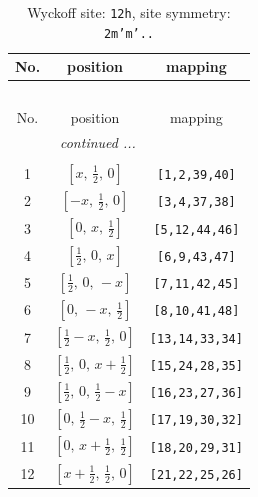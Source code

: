 \documentclass[fleqn,8pt]{jsarticle}
\begin{document}
\begin{longtable}{ccc}
\caption{Wyckoff site: {\tt 12h}, site symmetry: {\tt 2m'm'..}}
 \\
 \hline \hline
No. & position & mapping \\ \hline \endfirsthead

\multicolumn{2}{l}{\tablename\ \thetable{}} \\
 \hline \hline
No. & position & mapping \\ \hline \endhead

 \hline \hline
\multicolumn{2}{r}{\footnotesize\it continued ...} \\ \endfoot

 \hline \hline
\multicolumn{2}{r}{} \\ \endlastfoot

1 & $\left[ x,\, \frac{1}{2},\, 0 \right]$ & {\tt [1,2,39,40]} \\ \hline
2 & $\left[ - x,\, \frac{1}{2},\, 0 \right]$ & {\tt [3,4,37,38]} \\ \hline
3 & $\left[ 0,\, x,\, \frac{1}{2} \right]$ & {\tt [5,12,44,46]} \\ \hline
4 & $\left[ \frac{1}{2},\, 0,\, x \right]$ & {\tt [6,9,43,47]} \\ \hline
5 & $\left[ \frac{1}{2},\, 0,\, - x \right]$ & {\tt [7,11,42,45]} \\ \hline
6 & $\left[ 0,\, - x,\, \frac{1}{2} \right]$ & {\tt [8,10,41,48]} \\ \hline
7 & $\left[ \frac{1}{2} - x,\, \frac{1}{2},\, 0 \right]$ & {\tt [13,14,33,34]} \\ \hline
8 & $\left[ \frac{1}{2},\, 0,\, x + \frac{1}{2} \right]$ & {\tt [15,24,28,35]} \\ \hline
9 & $\left[ \frac{1}{2},\, 0,\, \frac{1}{2} - x \right]$ & {\tt [16,23,27,36]} \\ \hline
10 & $\left[ 0,\, \frac{1}{2} - x,\, \frac{1}{2} \right]$ & {\tt [17,19,30,32]} \\ \hline
11 & $\left[ 0,\, x + \frac{1}{2},\, \frac{1}{2} \right]$ & {\tt [18,20,29,31]} \\ \hline
12 & $\left[ x + \frac{1}{2},\, \frac{1}{2},\, 0 \right]$ & {\tt [21,22,25,26]} \\
\end{longtable}
\renewcommand{\arraystretch}{1.2}
\end{document}
